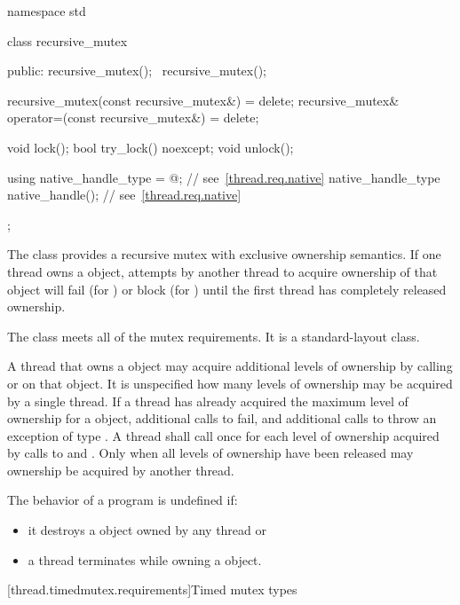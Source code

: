 %
\begin{codeblock}
namespace std {
  class recursive_mutex {
  public:
    recursive_mutex();
    ~recursive_mutex();

    recursive_mutex(const recursive_mutex&) = delete;
    recursive_mutex& operator=(const recursive_mutex&) = delete;

    void lock();
    bool try_lock() noexcept;
    void unlock();

    using native_handle_type = @\impdefnc@;          // see~\ref{thread.req.native}
    native_handle_type native_handle();                         // see~\ref{thread.req.native}
  };
}
\end{codeblock}

\pnum
{}%
The class  provides a recursive mutex with exclusive ownership
semantics. If one thread owns a  object, attempts by another
thread to acquire ownership of that object will fail (for ) or block
(for ) until the first thread has completely released ownership.

\pnum
The class  meets
all of the mutex requirements.
It is a standard-layout class.

\pnum
A thread that owns a  object may acquire additional levels of
ownership by calling  or  on that object. It is
unspecified how many levels of ownership may be acquired by a single thread. If a thread
has already acquired the maximum level of ownership for a 
object, additional calls to  fail, and additional calls to
 throw an exception of type . A thread
shall call  once for each level of ownership acquired by calls to
 and . Only when all levels of ownership have been
released may ownership be acquired by another thread.

\pnum
The behavior of a program is undefined if:
\begin{itemize}
\item it destroys a  object owned by any thread or
\item a thread terminates while owning a  object.
\end{itemize}

[thread.timedmutex.requirements]{Timed mutex types}

